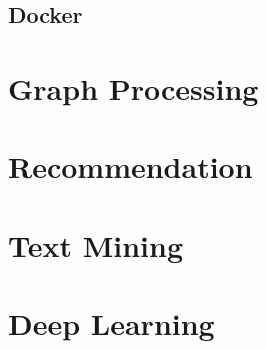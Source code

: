 \documentclass[12pt]{book}
\begin{document}
\section[Docker]
{Docker}

\chapter[Graph Processing]
{Graph Processing}

\chapter[Recommendation]
{Recommendation}

\chapter[Text Mining]
{Text Mining}

\chapter[Deep Learning]
{Deep Learning}


\printindex





\end{document}
